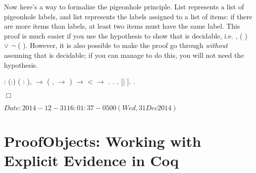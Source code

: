 \documentclass[12pt]{report}
\begin{document}
Now here's a way to formalize the pigeonhole principle. List 
    represents a list of pigeonhole labels, and list  represents
    the labels assigned to a list of items: if there are more items
    than labels, at least two items must have the same label.  This
    proof is much easier if you use the  hypothesis
    to show that  is decidable, i.e. \coqdockw{\ensuremath{\forall}} 
    , (  ) \ensuremath{\lor} \ensuremath{\lnot} (  ).  However, it is also
    possible to make the proof go through \textit{without} assuming that
     is decidable; if you can manage to do this, you will
    not need the  hypothesis. \begin{coqdoccode}
\coqdocemptyline
\coqdocnoindent
{} : \coqdockw{\ensuremath{\forall}} (:) (  : ), \coqdoceol
\coqdocindent{1.50em}
 \ensuremath{\rightarrow} \coqdoceol
\coqdocindent{1.50em}
(\coqdockw{\ensuremath{\forall}} ,    \ensuremath{\rightarrow}   ) \ensuremath{\rightarrow} \coqdoceol
\coqdocindent{1.50em}
  <   \ensuremath{\rightarrow} \coqdoceol
\coqdocindent{1.50em}
 .\coqdoceol
\coqdocnoindent
{}.\coqdoceol
\coqdocindent{1.50em}
  .    [| ].\coqdoceol
 .\coqdoceol
\end{coqdoccode}
\ensuremath{\Box} \begin{coqdoccode}
\coqdocemptyline
\coqdocemptyline
\end{coqdoccode}
$Date: 2014-12-31 16:01:37 -0500 (Wed, 31 Dec 2014) $ \begin{coqdoccode}
\end{coqdoccode}

\begin{coqdoccode}
\end{coqdoccode}
\section{ProofObjects: Working with Explicit Evidence in Coq}
\end{document}
